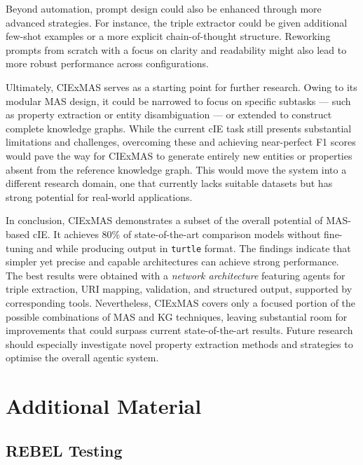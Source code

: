 \documentclass[a4paper,oneside,bibliography=totoc]{scrbook}
\begin{document}
Beyond automation, prompt design could also be enhanced through more advanced strategies. For instance, the triple extractor could be given additional few-shot examples or a more explicit chain-of-thought structure. Reworking prompts from scratch with a focus on clarity and readability might also lead to more robust performance across configurations.

Ultimately, CIExMAS serves as a starting point for further research. Owing to its modular \ac{MAS} design, it could be narrowed to focus on specific subtasks — such as property extraction or entity disambiguation — or extended to construct complete knowledge graphs. While the current \ac{cIE} task still presents substantial limitations and challenges, overcoming these and achieving near-perfect F1 scores would pave the way for CIExMAS to generate entirely new entities or properties absent from the reference knowledge graph. This would move the system into a different research domain, one that currently lacks suitable datasets but has strong potential for real-world applications.

In conclusion, CIExMAS demonstrates a subset of the overall potential of \ac{MAS}-based \ac{cIE}. It achieves 80\% of state-of-the-art comparison models without fine-tuning and while producing output in \texttt{turtle} format. The findings indicate that simpler yet precise and capable architectures can achieve strong performance. The best results were obtained with a \textit{network architecture} featuring agents for triple extraction, \ac{URI} mapping, validation, and structured output, supported by corresponding tools. Nevertheless, CIExMAS covers only a focused portion of the possible combinations of \ac{MAS} and \ac{KG} techniques, leaving substantial room for improvements that could surpass current state-of-the-art results. Future research should especially investigate novel property extraction methods and strategies to optimise the overall agentic system.



\appendix
\chapter{Additional Material}
\label{ch:additional_material}

\section{REBEL Testing}
\label{sec:rebel_testing}
\end{document}
